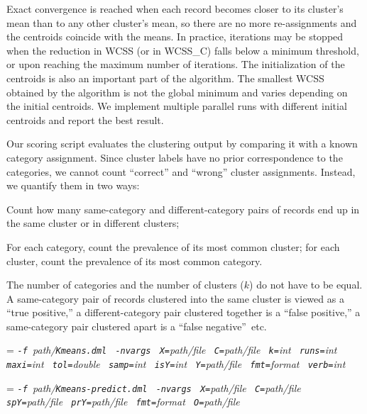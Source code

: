Exact convergence is reached when each record becomes closer to its
cluster's mean than to any other cluster's mean, so there are no more re-assignments
and the centroids coincide with the means.  In practice, iterations may be stopped
when the reduction in WCSS (or in WCSS\_C) falls below a minimum threshold, or upon
reaching the maximum number of iterations.  The initialization of the centroids is also
an important part of the algorithm.  The smallest WCSS obtained by the algorithm is not
the global minimum and varies depending on the initial centroids.  We implement multiple
parallel runs with different initial centroids and report the best result.

Our scoring script evaluates the clustering output by comparing it with a known category
assignment.  Since cluster labels have no prior correspondence to the categories, we
cannot count ``correct'' and ``wrong'' cluster assignments.  Instead, we quantify them in
two ways:
\begin{Enumerate}
\item Count how many same-category and different-category pairs of records end up in the
same cluster or in different clusters;
\item For each category, count the prevalence of its most common cluster; for each
cluster, count the prevalence of its most common category.
\end{Enumerate}
The number of categories and the number of clusters ($k$) do not have to be equal.  
A same-category pair of records clustered into the same cluster is viewed as a
``true positive,'' a different-category pair clustered together is a ``false positive,''
a same-category pair clustered apart is a ``false negative''~etc.


\smallskip
{}
\smallskip

{\hangindent=\parindent\noindent\it%
{\tt{}-f }path/\/{\tt{}Kmeans.dml}
{\tt{} -nvargs}
{\tt{} X=}path/file
{\tt{} C=}path/file
{\tt{} k=}int
{\tt{} runs=}int
{\tt{} maxi=}int
{\tt{} tol=}double
{\tt{} samp=}int
{\tt{} isY=}int
{\tt{} Y=}path/file
{\tt{} fmt=}format
{\tt{} verb=}int

}

\smallskip
{}
\smallskip

{\hangindent=\parindent\noindent\it%
{\tt{}-f }path/\/{\tt{}Kmeans-predict.dml}
{\tt{} -nvargs}
{\tt{} X=}path/file
{\tt{} C=}path/file
{\tt{} spY=}path/file
{\tt{} prY=}path/file
{\tt{} fmt=}format
{\tt{} O=}path/file

}


